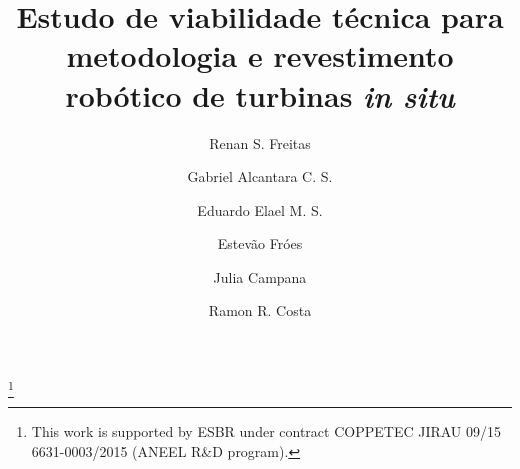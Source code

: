 \documentclass{main}
\begin{document}
\begin{frontmatter}

\title{Estudo de viabilidade técnica para metodologia e revestimento
robótico de turbinas \textit{in situ}
} 

\thanks[footnoteinfo]{This work is supported by ESBR under contract COPPETEC
JIRAU 09/15 6631-0003/2015 (ANEEL R\&D program).}

\author[1]{Renan S. Freitas}
\author[1]{Gabriel Alcantara C. S.}
\author[1]{Eduardo Elael M. S.}
\author[1]{Estevão Fróes}
\author[2]{Julia Campana}
\author[1]{Ramon R. Costa}

  \address[1]{Departamento de Engenharia Elétrica, COPPE UFRJ, Rio de Janeiro,
  Brasil} 
  \address[2]{Laboratório de Controle e Automação, Engenharia de Aplicação e
  Desenvolvimento (LEAD), Rio de Janeiro, Brasil}
  
\begin{abstract}                %
\end{abstract} 
 
\begin{keyword}
\end{keyword}

\end{frontmatter}

  
 
\appendix
\end{document}
